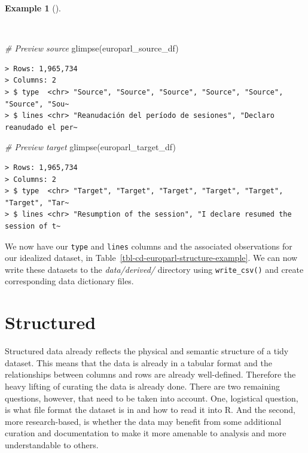 \documentclass[
  letterpaper,
]{latex/krantz}
\newenvironment{Shaded}{\begin{snugshade}}{\end{snugshade}}
\newcommand{\CommentTok}[1]{\textcolor[rgb]{0.00,0.00,0.00}{\textit{#1}}}
\newcommand{\FunctionTok}[1]{\textcolor[rgb]{0.00,0.00,0.00}{#1}}
\newcommand{\NormalTok}[1]{\textcolor[rgb]{0.00,0.00,0.00}{#1}}
\theoremstyle{definition}
\newtheorem{example}{Example}[chapter]
\theoremstyle{remark}
\begin{document}
\begin{example}[]\protect\hypertarget{exm-cd-europarl-glimpse}{}\label{exm-cd-europarl-glimpse}

~

\begin{Shaded}
\begin{Highlighting}[]
\CommentTok{\# Preview source}
\FunctionTok{glimpse}\NormalTok{(europarl\_source\_df)}
\end{Highlighting}
\end{Shaded}

\begin{verbatim}
> Rows: 1,965,734
> Columns: 2
> $ type  <chr> "Source", "Source", "Source", "Source", "Source", "Source", "Sou~
> $ lines <chr> "Reanudación del período de sesiones", "Declaro reanudado el per~
\end{verbatim}

\begin{Shaded}
\begin{Highlighting}[]
\CommentTok{\# Preview target}
\FunctionTok{glimpse}\NormalTok{(europarl\_target\_df)}
\end{Highlighting}
\end{Shaded}

\begin{verbatim}
> Rows: 1,965,734
> Columns: 2
> $ type  <chr> "Target", "Target", "Target", "Target", "Target", "Target", "Tar~
> $ lines <chr> "Resumption of the session", "I declare resumed the session of t~
\end{verbatim}

\end{example}

We now have our \texttt{type} and \texttt{lines} columns and the
associated observations for our idealized dataset, in
Table~\ref{tbl-cd-europarl-structure-example}. We can now write these
datasets to the \emph{data/derived/} directory using
\texttt{write\_csv()} and create corresponding data dictionary files.

\section{Structured}\label{structured}

Structured data already reflects the physical and semantic structure of
a tidy dataset. This means that the data is already in a tabular format
and the relationships between columns and rows are already well-defined.
Therefore the heavy lifting of curating the data is already done. There
are two remaining questions, however, that need to be taken into
account. One, logistical question, is what file format the dataset is in
and how to read it into R. And the second, more research-based, is
whether the data may benefit from some additional curation and
documentation to make it more amenable to analysis and more
understandable to others.
\end{document}
